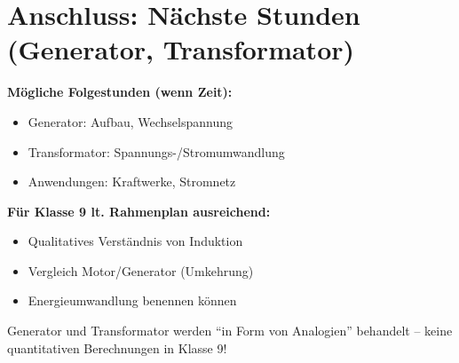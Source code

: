 \documentclass[a4paper,11pt]{article}
\begin{document}
\vspace{5mm}

\section*{Anschluss: Nächste Stunden (Generator, Transformator)}

\begin{infobox}[Überleitung]
\textbf{Mögliche Folgestunden (wenn Zeit):}
\begin{itemize}[noitemsep]
    \item Generator: Aufbau, Wechselspannung
    \item Transformator: Spannungs-/Stromumwandlung
    \item Anwendungen: Kraftwerke, Stromnetz
\end{itemize}

\textbf{Für Klasse 9 lt. Rahmenplan ausreichend:}
\begin{itemize}[noitemsep]
    \item Qualitatives Verständnis von Induktion
    \item Vergleich Motor/Generator (Umkehrung)
    \item Energieumwandlung benennen können
\end{itemize}

Generator und Transformator werden ``in Form von Analogien'' behandelt -- keine quantitativen Berechnungen in Klasse 9!
\end{infobox}
\end{document}
